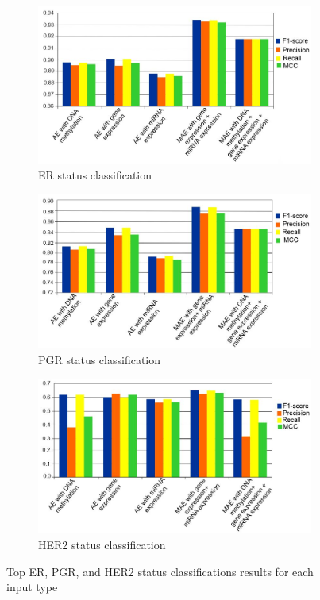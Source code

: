 \begin{figure}
	\centering
	\begin{subfigure}{.49\linewidth}
		\centering
		\includegraphics[scale=0.9]{images/1.png}
		\caption{ER status classification}
        \label{fig:top_er}
	\end{subfigure}
	\begin{subfigure}{.49\linewidth}
		\centering
		\includegraphics[scale=0.9]{images/2.png}
		\caption{PGR status classification}
        \label{fig:top_pgr}
	\end{subfigure}
	\begin{subfigure}{0.49\linewidth}
		\centering
		\includegraphics[scale=0.9]{images/3.png}
		\caption{HER2 status classification }
        \label{fig:top_her2}
	\end{subfigure}
	\caption{Top ER, PGR, and HER2 status classifications results for each input type~\cite{karimACCESS2019}} 
	\label{fig6}
		\vspace{-2mm} 
\end{figure}

